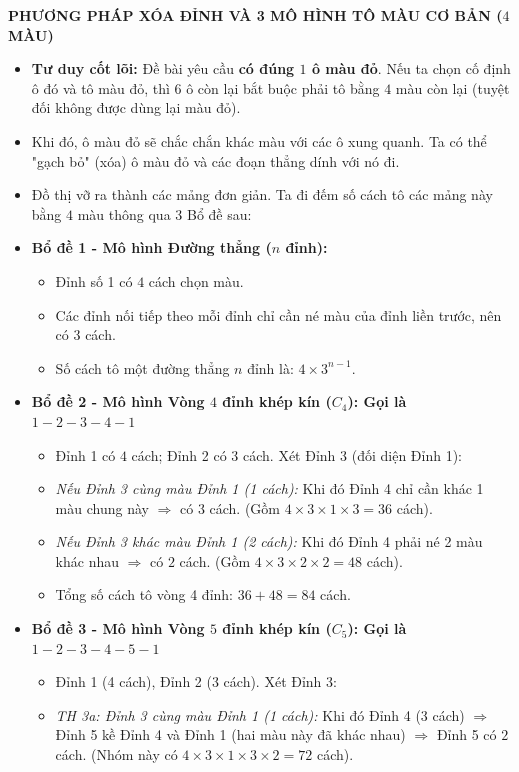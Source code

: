 \begin{ex}
{		\textbf{PHƯƠNG PHÁP XÓA ĐỈNH VÀ 3 MÔ HÌNH TÔ MÀU CƠ BẢN ($4$ MÀU)}
		\begin{itemize}
			\item \textbf{Tư duy cốt lõi:} Đề bài yêu cầu \textbf{có đúng $1$ ô màu đỏ}. Nếu ta chọn cố định ô đó và tô màu đỏ, thì $6$ ô còn lại bắt buộc phải tô bằng $4$ màu còn lại (tuyệt đối không được dùng lại màu đỏ).
			\item Khi đó, ô màu đỏ sẽ chắc chắn khác màu với các ô xung quanh. Ta có thể "gạch bỏ" (xóa) ô màu đỏ và các đoạn thẳng dính với nó đi.
			\item Đồ thị vỡ ra thành các mảng đơn giản. Ta đi đếm số cách tô các mảng này bằng $4$ màu thông qua $3$ Bổ đề sau:
			\item \textbf{Bổ đề 1 - Mô hình Đường thẳng ($n$ đỉnh):}
			\begin{itemize}
				\item Đỉnh số 1 có $4$ cách chọn màu.
				\item Các đỉnh nối tiếp theo mỗi đỉnh chỉ cần né màu của đỉnh liền trước, nên có $3$ cách.
				\item Số cách tô một đường thẳng $n$ đỉnh là: $\displaystyle 4 \times 3^{n-1}$.
			\end{itemize}
			\item \textbf{Bổ đề 2 - Mô hình Vòng $4$ đỉnh khép kín ($C_4$): Gọi là $1-2-3-4-1$}
			\begin{itemize}
				\item Đỉnh 1 có $4$ cách; Đỉnh 2 có $3$ cách. Xét Đỉnh 3 (đối diện Đỉnh 1):
				\item \textit{Nếu Đỉnh 3 cùng màu Đỉnh 1 (1 cách):} Khi đó Đỉnh 4 chỉ cần khác 1 màu chung này $\Rightarrow$ có $3$ cách. (Gồm $4 \times 3 \times 1 \times 3 = 36$ cách).
				\item \textit{Nếu Đỉnh 3 khác màu Đỉnh 1 (2 cách):} Khi đó Đỉnh 4 phải né 2 màu khác nhau $\Rightarrow$ có $2$ cách. (Gồm $4 \times 3 \times 2 \times 2 = 48$ cách).
				\item Tổng số cách tô vòng 4 đỉnh: $\displaystyle 36 + 48 = 84$ cách.
			\end{itemize}
			\item \textbf{Bổ đề 3 - Mô hình Vòng $5$ đỉnh khép kín ($C_5$): Gọi là $1-2-3-4-5-1$}
			\begin{itemize}
				\item Đỉnh 1 (4 cách), Đỉnh 2 (3 cách). Xét Đỉnh 3:
				\item \textit{TH 3a: Đỉnh 3 cùng màu Đỉnh 1 (1 cách):} Khi đó Đỉnh 4 (3 cách) $\Rightarrow$ Đỉnh 5 kề Đỉnh 4 và Đỉnh 1 (hai màu này đã khác nhau) $\Rightarrow$ Đỉnh 5 có $2$ cách. (Nhóm này có $4 \times 3 \times 1 \times 3 \times 2 = 72$ cách).

\end{itemize}
\end{itemize}}
\end{ex}
